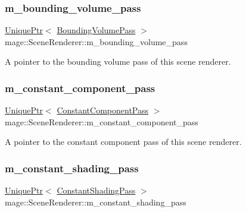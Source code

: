 \subsubsection{\texorpdfstring{m\+\_\+bounding\+\_\+volume\+\_\+pass}{m\_bounding\_volume\_pass}}
{\footnotesize\ttfamily \hyperlink{namespacemage_a3316d7143a973e37adf1110f2e80ca31}{Unique\+Ptr}$<$ \hyperlink{classmage_1_1_bounding_volume_pass}{Bounding\+Volume\+Pass} $>$ mage\+::\+Scene\+Renderer\+::m\+\_\+bounding\+\_\+volume\+\_\+pass\hspace{0.3cm}{\ttfamily [private]}}

A pointer to the bounding volume pass of this scene renderer. \hypertarget{classmage_1_1_scene_renderer_a34006a25d67bbe2aa4f25a61dee8cd2f}{}\label{classmage_1_1_scene_renderer_a34006a25d67bbe2aa4f25a61dee8cd2f} 
\subsubsection{\texorpdfstring{m\+\_\+constant\+\_\+component\+\_\+pass}{m\_constant\_component\_pass}}
{\footnotesize\ttfamily \hyperlink{namespacemage_a3316d7143a973e37adf1110f2e80ca31}{Unique\+Ptr}$<$ \hyperlink{classmage_1_1_constant_component_pass}{Constant\+Component\+Pass} $>$ mage\+::\+Scene\+Renderer\+::m\+\_\+constant\+\_\+component\+\_\+pass\hspace{0.3cm}{\ttfamily [private]}}

A pointer to the constant component pass of this scene renderer. \hypertarget{classmage_1_1_scene_renderer_a2e98538d6add0603a2da5b949aa26953}{}\label{classmage_1_1_scene_renderer_a2e98538d6add0603a2da5b949aa26953} 
\subsubsection{\texorpdfstring{m\+\_\+constant\+\_\+shading\+\_\+pass}{m\_constant\_shading\_pass}}
{\footnotesize\ttfamily \hyperlink{namespacemage_a3316d7143a973e37adf1110f2e80ca31}{Unique\+Ptr}$<$ \hyperlink{classmage_1_1_constant_shading_pass}{Constant\+Shading\+Pass} $>$ mage\+::\+Scene\+Renderer\+::m\+\_\+constant\+\_\+shading\+\_\+pass\hspace{0.3cm}{\ttfamily [private]}}


